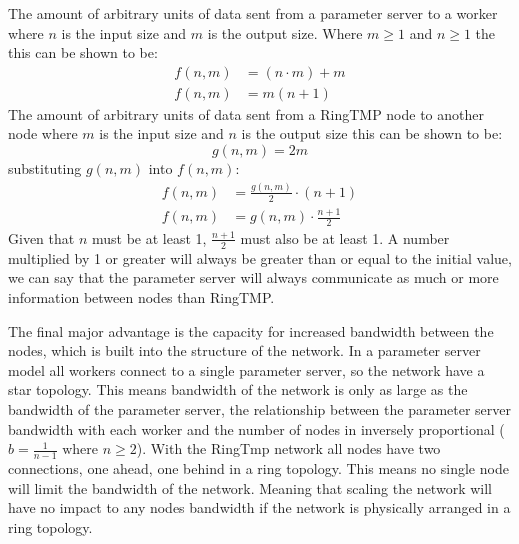 The amount of arbitrary units of data sent from a parameter server to a worker
where \(n\) is the input size and \(m\) is the output size. Where \( m \geq 1\)
and \( n \geq 1\) the this can be shown to be:
\begin{equation}
    \begin{aligned}
        f(n,m) &= (n \cdot m) + m\\
        f(n,m) &= m(n+1)
    \end{aligned}
\end{equation}
The amount of arbitrary units of data sent from a RingTMP node to another node where \(m\) is
the input size and \(n\) is the output size this can be shown to be:
\begin{equation}
    g(n,m) = 2m
\end{equation}
substituting \(g(n,m)\) into \(f(n,m)\):
\begin{equation}
    \begin{aligned}
        f(n,m) &= \frac{g(n,m)}{2} \cdot (n+1)\\[1em]
        f(n,m) &= g(n,m) \cdot \frac{n+1}{2}
    \end{aligned}
\end{equation}
Given that \(n\) must be at least 1,  \( \frac{n+1}{2} \) must also be at least
1. A number multiplied by 1 or greater will always be greater than or equal to
the initial value, we can say that the parameter server will always communicate
as much or more information between nodes than RingTMP.

The final major advantage is the capacity for increased bandwidth between the
nodes, which is built into the structure of the network. In a parameter server
model all workers connect to a single parameter server, so the network have a
star topology. This means bandwidth of the network is only as large as the
bandwidth of the parameter server, the relationship between the parameter server
bandwidth with each worker and the number of nodes in inversely proportional
(\(b = \frac{1}{n-1} \text{ where } n \geq 2\)). With the RingTmp network all
nodes have two connections, one ahead, one behind in a ring topology. This means
no single node will limit the bandwidth of the network. Meaning that scaling the
network will have no impact to any nodes bandwidth if the network is physically
arranged in a ring topology.


